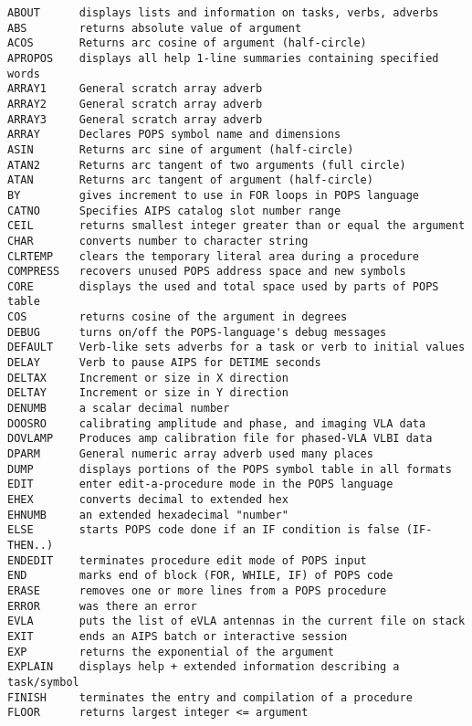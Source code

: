 \vfill\eject
{}

\vskip 0.5pt
\bbve\begin{verbatim}
ABOUT      displays lists and information on tasks, verbs, adverbs
ABS        returns absolute value of argument
ACOS       Returns arc cosine of argument (half-circle)
APROPOS    displays all help 1-line summaries containing specified words
ARRAY1     General scratch array adverb
ARRAY2     General scratch array adverb
ARRAY3     General scratch array adverb
ARRAY      Declares POPS symbol name and dimensions
ASIN       Returns arc sine of argument (half-circle)
ATAN2      Returns arc tangent of two arguments (full circle)
ATAN       Returns arc tangent of argument (half-circle)
BY         gives increment to use in FOR loops in POPS language
CATNO      Specifies AIPS catalog slot number range
CEIL       returns smallest integer greater than or equal the argument
CHAR       converts number to character string
CLRTEMP    clears the temporary literal area during a procedure
COMPRESS   recovers unused POPS address space and new symbols
CORE       displays the used and total space used by parts of POPS table
COS        returns cosine of the argument in degrees
DEBUG      turns on/off the POPS-language's debug messages
DEFAULT    Verb-like sets adverbs for a task or verb to initial values
DELAY      Verb to pause AIPS for DETIME seconds
DELTAX     Increment or size in X direction
DELTAY     Increment or size in Y direction
DENUMB     a scalar decimal number
DOOSRO     calibrating amplitude and phase, and imaging VLA data
DOVLAMP    Produces amp calibration file for phased-VLA VLBI data
DPARM      General numeric array adverb used many places
DUMP       displays portions of the POPS symbol table in all formats
EDIT       enter edit-a-procedure mode in the POPS language
EHEX       converts decimal to extended hex
EHNUMB     an extended hexadecimal "number"
ELSE       starts POPS code done if an IF condition is false (IF-THEN..)
ENDEDIT    terminates procedure edit mode of POPS input
END        marks end of block (FOR, WHILE, IF) of POPS code
ERASE      removes one or more lines from a POPS procedure
ERROR      was there an error
EVLA       puts the list of eVLA antennas in the current file on stack
EXIT       ends an AIPS batch or interactive session
EXP        returns the exponential of the argument
EXPLAIN    displays help + extended information describing a task/symbol
FINISH     terminates the entry and compilation of a procedure
FLOOR      returns largest integer <= argument

\end{verbatim}
